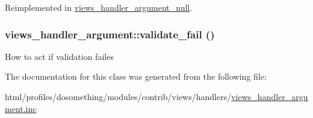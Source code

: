 Reimplemented in \hyperlink{classviews__handler__argument__null_afc4fd62d96247a2ebebbd7e44f0742ce}{views\_\-handler\_\-argument\_\-null}.\hypertarget{classviews__handler__argument_ac180c7b4e4f53bdf39272ac17591f13a}{
\subsubsection[{validate\_\-fail}]{\setlength{\rightskip}{0pt plus 5cm}views\_\-handler\_\-argument::validate\_\-fail ()}}
\label{classviews__handler__argument_ac180c7b4e4f53bdf39272ac17591f13a}
How to act if validation failes 

The documentation for this class was generated from the following file:\begin{DoxyCompactItemize}
\item 
html/profiles/dosomething/modules/contrib/views/handlers/\hyperlink{views__handler__argument_8inc}{views\_\-handler\_\-argument.inc}\end{DoxyCompactItemize}
